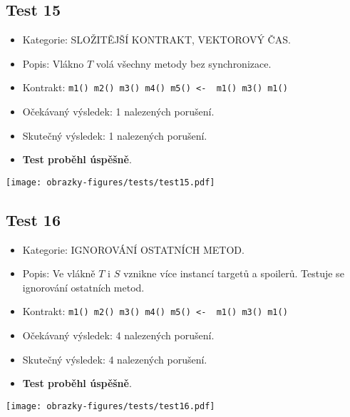 \subsection*{Test 15}
\begin{itemize}
\item Kategorie: SLOŽITĚJŠÍ KONTRAKT, VEKTOROVÝ ČAS.
\item Popis: Vlákno $T$ volá všechny metody bez synchronizace.
\item Kontrakt: \texttt{m1() m2() m3() m4() m5() <- { m1() m3() m1()}}
\item Očekávaný výsledek: 1 nalezených porušení.
\item Skutečný výsledek: 1 nalezených porušení.

\item \textbf{Test proběhl úspěšně}.
\end{itemize}
\begin{center}
    \centering
    \texttt{[image: obrazky-figures/tests/test15.pdf]}
    \label{test15}
\end{center}
\subsection*{Test 16}
\begin{itemize}
\item Kategorie: IGNOROVÁNÍ OSTATNÍCH METOD.
\item Popis: Ve vlákně $T$ i $S$ vznikne více instancí targetů a spoilerů. Testuje se ignorování ostatních metod.
\item Kontrakt: \texttt{m1() m2() m3() m4() m5() <- { m1() m3() m1()}}
\item Očekávaný výsledek: 4 nalezených porušení.

\item Skutečný výsledek: 4 nalezených porušení.
\item \textbf{Test proběhl úspěšně}.
\end{itemize}
\begin{center}
    \centering
    \texttt{[image: obrazky-figures/tests/test16.pdf]}
    \label{test16}
\end{center}

